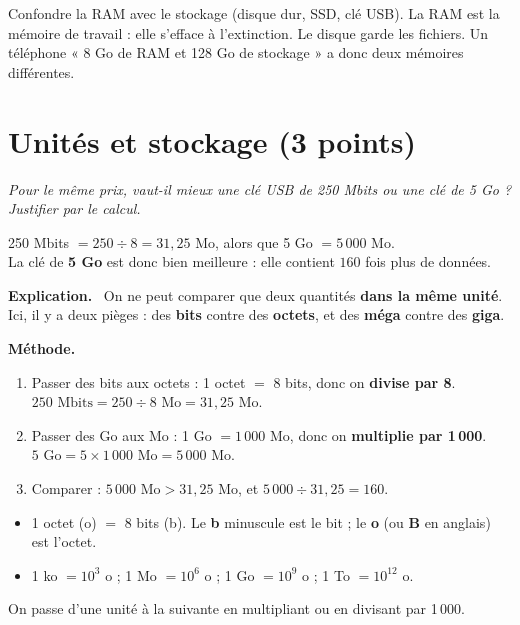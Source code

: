 \documentclass[addpoints, 11pt]{exam}
\newcommand{\enonce}[1]{\textit{#1}\par\smallskip}
\newcommand{\methode}{\par\smallskip\noindent\textbf{Méthode.}\ }
\newcommand{\explication}{\par\smallskip\noindent\textbf{Explication.}\ }
\DeclareRobustCommand{\_}{\textunderscore\allowbreak}
\begin{document}
\begin{questions}
\begin{erreur}
Confondre la RAM avec le stockage (disque dur, SSD, clé USB). La RAM est la mémoire de travail : elle s'efface à l'extinction. Le disque garde les fichiers. Un téléphone « 8 Go de RAM et 128 Go de stockage » a donc deux mémoires différentes.
\end{erreur}

\section{Unités et stockage (3 points)}

\question[1] \enonce{Pour le même prix, vaut-il mieux une clé USB de 250 Mbits ou une clé de 5 Go ? Justifier par le calcul.}

\begin{reponse}
250 Mbits $= 250 \div 8 = 31{,}25$ Mo, alors que 5 Go $= 5\,000$ Mo.\\
La clé de \textbf{5 Go} est donc bien meilleure : elle contient $160$ fois plus de données.
\end{reponse}

\explication
On ne peut comparer que deux quantités \textbf{dans la même unité}. Ici, il y a deux pièges : des \textbf{bits} contre des \textbf{octets}, et des \textbf{méga} contre des \textbf{giga}.

\methode
\begin{enumerate}
  \item Passer des bits aux octets : 1 octet $=$ 8 bits, donc on \textbf{divise par 8}.\\
  $250 \text{ Mbits} = 250 \div 8 \text{ Mo} = 31{,}25 \text{ Mo}$.
  \item Passer des Go aux Mo : 1 Go $= 1\,000$ Mo, donc on \textbf{multiplie par 1\,000}.\\
  $5 \text{ Go} = 5 \times 1\,000 \text{ Mo} = 5\,000 \text{ Mo}$.
  \item Comparer : $5\,000 \text{ Mo} > 31{,}25 \text{ Mo}$, et $5\,000 \div 31{,}25 = 160$.
\end{enumerate}

\begin{astuce}
\begin{itemize}
  \item 1 octet (o) $=$ 8 bits (b). Le \textbf{b} minuscule est le bit ; le \textbf{o} (ou \textbf{B} en anglais) est l'octet.
  \item 1 ko $=10^3$ o ; 1 Mo $=10^6$ o ; 1 Go $=10^9$ o ; 1 To $=10^{12}$ o.
\end{itemize}
On passe d'une unité à la suivante en multipliant ou en divisant par 1\,000.
\end{astuce}


\end{questions}
\end{document}
